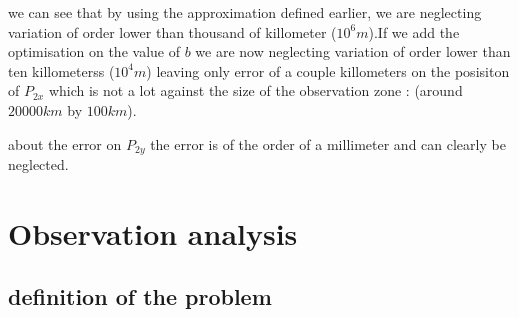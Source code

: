 \documentclass{article} %
\begin{document}
		
		we can see that by using the approximation defined earlier, we are neglecting variation of order lower than thousand of killometer ($10^6 m$).If we add the optimisation on the value of $b$ we are now neglecting variation of order lower than ten killometerss ($10^4 m$) leaving only error of a couple killometers on the  posisiton of $P_{2x}$ which is not a lot against the size of the observation zone : (around $ 20000 km $ by $100 km$).
		
		about the error on $P_{2y}$ the error is of the order of a millimeter and can clearly be neglected.
		
		
		
		
		
		
		\newpage
		\section{Observation analysis}
		
		\subsection{definition of the problem}
		
\end{document}
